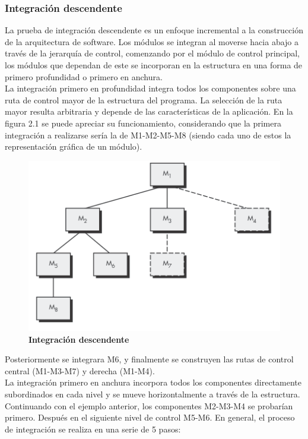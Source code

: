\subsubsection{Integración descendente}
La prueba de integración descendente es un enfoque incremental a la construcción de la arquitectura de software. Los módulos se integran al moverse hacia abajo a través de la jerarquía de control, comenzando por el módulo de control principal, los módulos que dependan de este se incorporan en la estructura en una forma de primero profundidad o primero en anchura.\\ La integración primero en profundidad integra todos los componentes sobre una ruta de control mayor de la estructura del programa. La selección de la ruta mayor resulta arbitraria y depende de las características de la aplicación.
En la figura 2.1 se puede apreciar su funcionamiento, considerando que la primera integración a realizarse sería la de M1-M2-M5-M8 (siendo cada uno de estos la representación gráfica de un módulo).
\begin{figure}[H]
	\centering
	\includegraphics[scale=1]{project/images/profundidad.png}
	\caption{\textbf{Integración descendente}}
\end{figure}
Posteriormente se integrara M6, y finalmente se construyen las rutas de control central (M1-M3-M7) y derecha (M1-M4).\\
La integración primero en anchura incorpora todos los componentes directamente subordinados en cada nivel y se mueve horizontalmente a través de la estructura.\\ Continuando con el ejemplo anterior, los componentes M2-M3-M4 se probarían primero. Después en el siguiente nivel de control M5-M6.
En general, el proceso de integración se realiza en una serie de 5 pasos:
